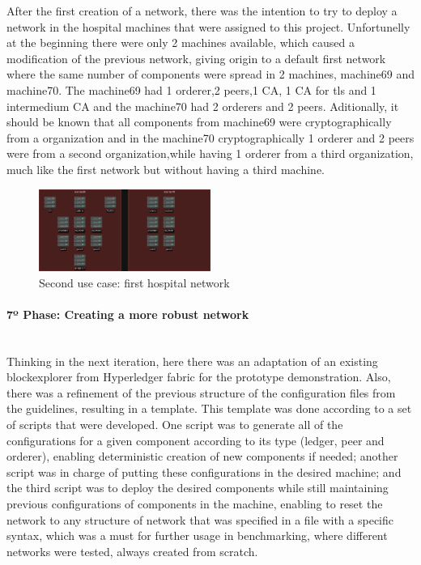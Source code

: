 After the first creation of a network, there was the intention to try to deploy a network in the hospital machines that were assigned to 
this project. Unfortunelly at the beginning there were only 2 machines available, which caused a modification of the previous network, 
giving origin to a default first network where the same number of components were spread in 2 machines, machine69 and machine70. The 
machine69 had 1 orderer,2 peers,1 CA, 1 CA for tls and 1 intermedium CA and the machine70 had 2 orderers and 2 peers. Aditionally, 
it should be known that all components from machine69 were cryptographically from a organization and in the machine70 cryptographically 1 
orderer and 2 peers were from a second organization,while having 1 orderer from a third organization, much like the first network but 
without having a third machine.
\begin{figure}[H]
    \centering
    \includegraphics[width=0.5\textwidth]{assets/use-case-2/default-first-hospital.drawio.png} %
    \caption{Second use case: first hospital network}
    \label{fig:sample-image} 
\end{figure}

\paragraph{7º Phase: Creating a more robust network}\mbox{}\\
Thinking in the next iteration, here there was an adaptation of an existing blockexplorer from Hyperledger fabric for the prototype 
demonstration. Also, there was a refinement of the previous structure of the configuration files from the guidelines, resulting in 
a template. This template was done according to a set of scripts that were developed. One script was to generate all of the configurations 
for a given component according to its type (ledger, peer and orderer), enabling deterministic creation of new components if needed; another 
script was in charge of putting these configurations in the desired machine; and the third script was to deploy the desired components while 
still maintaining previous configurations of components in the machine, enabling to reset the network to any structure of network that was 
specified in a file with a specific syntax, which was a must for further usage in benchmarking, where different networks were tested, always 
created from scratch.

